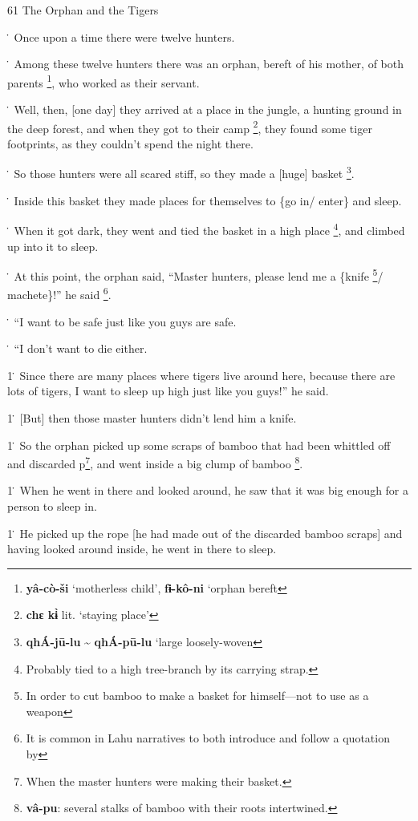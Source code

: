 
61 The Orphan and the Tigers

\. Once upon a time there were twelve hunters.

\. Among these twelve hunters there was an orphan, bereft of his mother, of both
parents \footnote{\textbf{yâ-cò-ši }`motherless child', \textbf{fɨ-kô-ni} `orphan bereft}, who worked as their servant.

\. Well, then, [one day] they arrived at a place in the jungle, a hunting ground
in the deep forest, and when they got to their camp \footnote{\textbf{chɛ kɨ̀} lit. `staying place'}, they found some tiger
footprints, as they couldn't spend the night there.

\. So those hunters were all scared stiff, so they made a [huge] basket \footnote{\textbf{qhÁ-jū-lu }\textasciitilde{}\textbf{ qhÁ-pū-lu} `large loosely-woven}.

\. Inside this basket they made places for themselves to \{go in/ enter\} and sleep.

\. When it got dark, they went and tied the basket in a high place \footnote{Probably tied to a high tree-branch by its carrying strap.}, and climbed
up into it to sleep.

\. At this point, the orphan said, ``Master hunters, please lend me a \{knife \footnote{In order to cut bamboo to make a basket for himself---not to use as a weapon}/
machete\}!'' he said \footnote{It is common in Lahu narratives to both introduce and follow a quotation by}.

\. ``I want to be safe just like you guys are safe.

\. ``I don't want to die either.

1\. Since there are many places where tigers live around here, because there are
lots of tigers, I want to sleep up high just like you guys!'' he said.

1\. [But] then those master hunters didn't lend him a knife.

1\. So the orphan picked up some scraps of bamboo that had been whittled off and
discarded p\footnote{When the master hunters were making their basket.}, and went inside a big clump of bamboo \footnote{\textbf{vâ-pu}: several stalks of bamboo with their roots intertwined.}.

1\. When he went in there and looked around, he saw that it was big enough for
a person to sleep in.

1\. He picked up the rope [he had made out of the discarded bamboo scraps] and
having looked around inside, he went in there to sleep.

